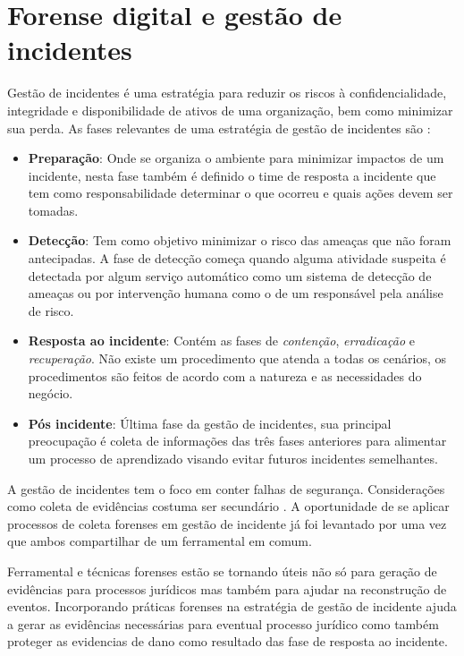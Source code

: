 \section{Forense digital e gestão de incidentes}
\label{sec:forenseeincidentes}

%
Gestão de incidentes é uma estratégia para reduzir os riscos à confidencialidade, integridade e disponibilidade de ativos de uma organização, bem como minimizar sua perda.
%
As fases relevantes de uma estratégia de gestão de incidentes são \cite{AdhiantoFasesGestaoIncidente:2010}: 


\begin{itemize}
%
\item \textbf{Preparação}: Onde se organiza o ambiente para minimizar impactos de um incidente, nesta fase também é definido o time de resposta a incidente que tem como responsabilidade determinar o que ocorreu e quais ações devem ser tomadas.
%
\item \textbf{Detecção}: Tem como objetivo minimizar o risco das ameaças que não foram antecipadas. A fase de detecção começa quando alguma atividade suspeita é detectada por algum serviço automático como um sistema de detecção de ameaças ou por intervenção humana como o de um responsável pela análise de risco.
%
\item \textbf{Resposta ao incidente}: Contém as fases de \textit{contenção}, \textit{erradicação} e \textit{recuperação}. Não existe um procedimento que atenda a todas os cenários, os procedimentos são feitos de acordo com a natureza e as necessidades do negócio.
%
\item \textbf{Pós incidente}: Última fase da gestão de incidentes, sua principal preocupação é coleta de informações das três fases anteriores para alimentar um processo de aprendizado visando evitar futuros incidentes semelhantes.

\end{itemize}

A gestão de incidentes tem o foco em conter falhas de segurança. 
%
Considerações como coleta de evidências costuma ser secundário \cite{AdhiantoFasesGestaoIncidente:2010}. 
%
A oportunidade de se aplicar processos de coleta forenses em gestão de incidente já foi levantado por \cite{AdhiantoIncidentHandlingForensic:2016} uma vez que ambos compartilhar de um ferramental em comum.
%

%
Ferramental e técnicas forenses estão se tornando úteis não só para geração de evidências para processos jurídicos mas também para ajudar na reconstrução de eventos.
%
Incorporando práticas forenses na estratégia de gestão de incidente ajuda a gerar as evidências necessárias para eventual processo jurídico como também proteger as evidencias de dano como resultado das fase de resposta ao incidente.





